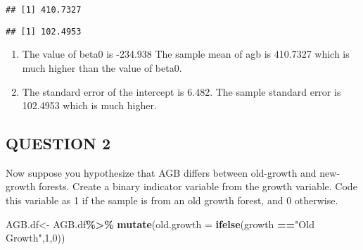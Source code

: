 \documentclass[
]{article}
\newenvironment{Shaded}{\begin{snugshade}}{\end{snugshade}}
\newcommand{\AttributeTok}[1]{\textcolor[rgb]{0.13,0.29,0.53}{#1}}
\newcommand{\CommentTok}[1]{\textcolor[rgb]{0.56,0.35,0.01}{\textit{#1}}}
\newcommand{\DecValTok}[1]{\textcolor[rgb]{0.00,0.00,0.81}{#1}}
\newcommand{\FunctionTok}[1]{\textcolor[rgb]{0.13,0.29,0.53}{\textbf{#1}}}
\newcommand{\NormalTok}[1]{#1}
\newcommand{\OtherTok}[1]{\textcolor[rgb]{0.56,0.35,0.01}{#1}}
\newcommand{\SpecialCharTok}[1]{\textcolor[rgb]{0.81,0.36,0.00}{\textbf{#1}}}
\newcommand{\StringTok}[1]{\textcolor[rgb]{0.31,0.60,0.02}{#1}}
\providecommand{\tightlist}{%
  \setlength{\itemsep}{0pt}\setlength{\parskip}{0pt}}
\begin{document}
\begin{Shaded}
\end{Shaded}

\begin{verbatim}
## [1] 410.7327
\end{verbatim}

\begin{Shaded}
\end{Shaded}

\begin{verbatim}
## [1] 102.4953
\end{verbatim}

\begin{enumerate}
\def\labelenumi{\alph{enumi})}
\tightlist
\item
  The value of beta0 is -234.938 The sample mean of agb is 410.7327
  which is much higher than the value of beta0.
\item
  The standard error of the intercept is 6.482. The sample standard
  error is 102.4953 which is much higher.
\end{enumerate}

\hypertarget{question-2}{%
\subsection{QUESTION 2}\label{question-2}}

Now suppose you hypothesize that AGB differs between old-growth and
new-growth forests. Create a binary indicator variable from the growth
variable. Code this variable as 1 if the sample is from an old growth
forest, and 0 otherwise.

\begin{Shaded}
\begin{Highlighting}[]
\NormalTok{AGB.df}\OtherTok{\textless{}{-}}\NormalTok{ AGB.df}\SpecialCharTok{\%\textgreater{}\%}
  \FunctionTok{mutate}\NormalTok{(}\AttributeTok{old.growth =} \FunctionTok{ifelse}\NormalTok{(growth }\SpecialCharTok{==}\StringTok{"Old Growth"}\NormalTok{,}\DecValTok{1}\NormalTok{,}\DecValTok{0}\NormalTok{))}
\end{Highlighting}
\end{Shaded}
\end{document}
